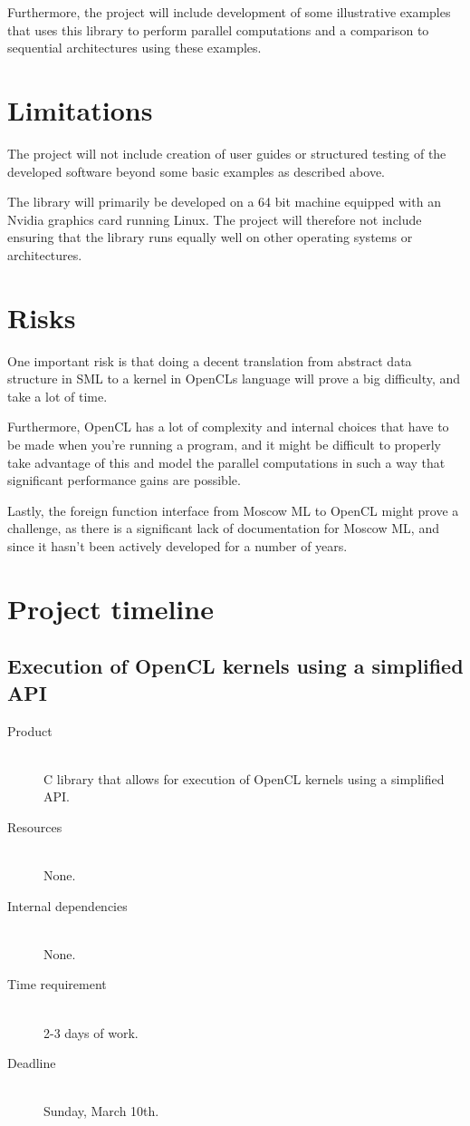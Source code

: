 \documentclass[a4paper, 10pt]{article}
\begin{document}
Furthermore, the project will include development of some illustrative
examples that uses this library to perform parallel computations and a
comparison to sequential architectures using these examples.

\section{Limitations}

The project will not include creation of user guides or structured
testing of the developed software beyond some basic examples as
described above.

The library will primarily be developed on a 64 bit machine equipped
with an Nvidia graphics card running Linux. The project will therefore
not include ensuring that the library runs equally well on other
operating systems or architectures.

\section{Risks}

One important risk is that doing a decent translation from abstract
data structure in SML to a kernel in OpenCLs language will prove a big
difficulty, and take a lot of time.

Furthermore, OpenCL has a lot of complexity and internal choices that
have to be made when you're running a program, and it might be
difficult to properly take advantage of this and model the parallel
computations in such a way that significant performance gains are
possible.

Lastly, the foreign function interface from Moscow ML to OpenCL might
prove a challenge, as there is a significant lack of documentation for
Moscow ML, and since it hasn't been actively developed for a number of
years.

\section{Project timeline}

\subsection{Execution of OpenCL kernels using a simplified API}
\label{sec:clibrary}

\begin{description}
  \item[Product] \hfill \\
    C library that allows for execution of OpenCL kernels using a
    simplified API.
  \item[Resources] \hfill \\
    None.
  \item[Internal dependencies] \hfill \\
    None.
  \item[Time requirement] \hfill \\
    2-3 days of work.
  \item[Deadline] \hfill \\
    Sunday, March 10th.
\end{description}
\end{document}

